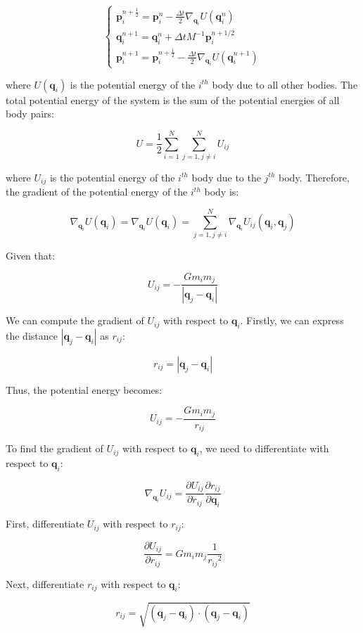 \documentclass{report}
\begin{document}
\[
	\begin{cases}
		\mathbf{p}_i^{n + \frac{1}{2}} = \mathbf{p}_i^n - \frac{\Delta t}{2} \nabla_{\mathbf{q}_i} U(\mathbf{q}^n_i) \\
		\mathbf{q}_i^{n+1} = \mathbf{q}_i^{n} + \Delta t M^{-1} \mathbf{p}_i^{n+1/2} \\
		\mathbf{p}_i^{n+1} = \mathbf{p}_i^{n+\frac{1}{2}} - \frac{\Delta t}{2} \nabla_{\mathbf{q}_i} U(\mathbf{q}^{n+1}_i)
	\end{cases}
\]

where \(U(\mathbf{q}_i)\) is the potential energy of the \(i^{th}\) body due to all other bodies. The total potential energy of the system is the sum of the potential energies of all body pairs:

\[
	U = \frac{1}{2} \sum_{i=1}^{N} \sum_{j=1, j\neq i}^{N} U_{ij}
\]

where \(U_{ij}\) is the potential energy of the \(i^{th}\) body due to the \(j^{th}\) body. Therefore, the gradient of the potential energy of the \(i^{th}\) body is:

\[
	\nabla_{\mathbf{q}_i} U(\mathbf{q}_i) = 
		\nabla_{\mathbf{q}_i} U(\mathbf{q}_i) = \sum_{j=1, j\neq i}^{N} \nabla_{\mathbf{q}_i} U_{ij}(\mathbf{q}_i, \mathbf{q}_j)
\]
		
Given that:
		
\[
	U_{ij} = -\frac{G m_i m_j}{|\mathbf{q}_j - \mathbf{q}_i|}
\]
		
We can compute the gradient of \(U_{ij}\) with respect to \(\mathbf{q}_i\). Firstly, we can express the distance \(|\mathbf{q}_j - \mathbf{q}_i|\) as \(r_{ij}\):

\[ 
	r_{ij} = |\mathbf{q}_j - \mathbf{q}_i| 
\]

Thus, the potential energy becomes:

\[ 
	U_{ij} = -\frac{G m_i m_j}{r_{ij}} 
\]

To find the gradient of \(U_{ij}\) with respect to \(\mathbf{q}_i\), we need to differentiate with respect to \(\mathbf{q}_i\):

\[ 
	\nabla_{\mathbf{q}_i} U_{ij} = \frac{\partial U_{ij}}{\partial r_{ij}} \frac{\partial r_{ij}}{\partial \mathbf{q}_i} 
\]

First, differentiate \(U_{ij}\) with respect to \(r_{ij}\):

\[ 
	\frac{\partial U_{ij}}{\partial r_{ij}} = G m_i m_j \frac{1}{{r_{ij}}^2} 
\]

Next, differentiate \(r_{ij}\) with respect to \(\mathbf{q}_i\):

\[ 
	r_{ij} = \sqrt{(\mathbf{q}_j - \mathbf{q}_i) \cdot (\mathbf{q}_j - \mathbf{q}_i)} 
\]
\end{document}

